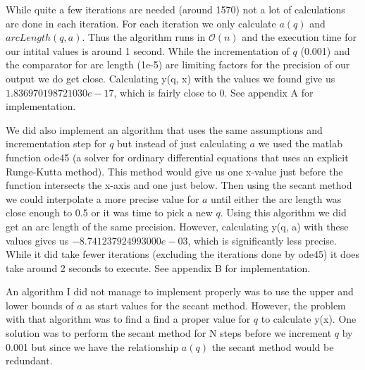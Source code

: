 While quite a few iterations are needed (around 1570) not a lot of calculations are done in each iteration. For each iteration we only calculate $a(q)$ and $arcLength(q, a)$. Thus the algorithm runs in $\mathcal{O}(n)$ and the execution time for our intital values is around 1 second. While the incrementation of $q$ (0.001) and the comparator for arc length (1e-5) are limiting factors for the precision of our output we do get close. Calculating y(q, x) with the values we found give us $1.836970198721030e-17$, which is fairly close to 0. See appendix A for implementation.

We did also implement an algorithm that uses the same assumptions and incrementation step for $q$ but instead of just calculating $a$ we used the matlab function ode45 (a solver for ordinary differential equations that uses an explicit Runge-Kutta method). This method would give us one x-value just before the function intersects the x-axis and one just below. Then using the secant method we could interpolate a more precise value for $a$ until either the arc length was close enough to 0.5 or it was time to pick a new $q$. Using this algorithm we did get an arc length of the same precision. However, calculating y(q, a) with these values gives us $-8.741237924993000e-03$, which is significantly less precise. While it did take fewer iterations (excluding the iterations done by ode45) it does take around 2 seconds to execute. See appendix B for implementation.

An algorithm I did not manage to implement properly was to use the upper and lower bounds of $a$ as start values for the secant method. However, the problem with that algorithm was to find a find a proper value for $q$ to calculate y(x). One solution was to perform the secant method for N steps before we increment $q$ by 0.001 but since we have the relationship $a(q)$ the secant method would be redundant.